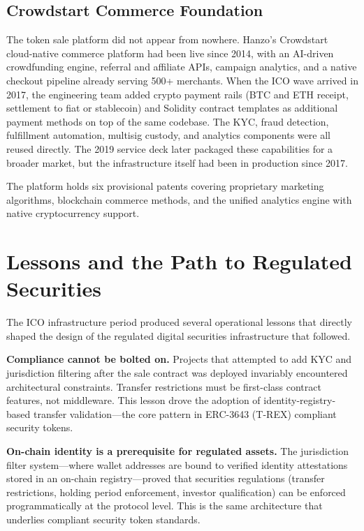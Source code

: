 \documentclass[11pt,letterpaper]{article}
\begin{document}
\subsection{Crowdstart Commerce Foundation}

The token sale platform did not appear from nowhere. Hanzo's
Crowdstart~\cite{crowdstart2014} cloud-native commerce platform had been live
since 2014, with an AI-driven crowdfunding engine, referral and affiliate APIs,
campaign analytics, and a native checkout pipeline already serving 500+
merchants. When the ICO wave arrived in 2017, the engineering team added
crypto payment rails (BTC and ETH receipt, settlement to fiat or stablecoin)
and Solidity contract templates as additional payment methods on top of the
same codebase. The KYC, fraud detection, fulfillment automation, multisig
custody, and analytics components were all reused directly. The 2019 service
deck later packaged these capabilities for a broader market, but the
infrastructure itself had been in production since 2017.

The platform holds six provisional patents covering proprietary marketing
algorithms, blockchain commerce methods, and the unified analytics engine with
native cryptocurrency support.

\section{Lessons and the Path to Regulated Securities}
\label{sec:lessons}

The ICO infrastructure period produced several operational lessons that directly
shaped the design of the regulated digital securities infrastructure that
followed.

\textbf{Compliance cannot be bolted on.} Projects that attempted to add KYC
and jurisdiction filtering after the sale contract was deployed invariably
encountered architectural constraints. Transfer restrictions must be
first-class contract features, not middleware. This lesson drove the adoption
of identity-registry-based transfer validation---the core pattern in ERC-3643
(T-REX) compliant security tokens.

\textbf{On-chain identity is a prerequisite for regulated assets.} The
jurisdiction filter system---where wallet addresses are bound to verified
identity attestations stored in an on-chain registry---proved that securities
regulations (transfer restrictions, holding period enforcement, investor
qualification) can be enforced programmatically at the protocol level. This
is the same architecture that underlies compliant security token standards.
\end{document}
